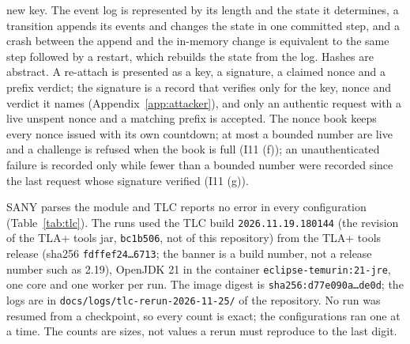 new key. The event log is represented by its
length and the state it determines, a transition appends its events and
changes the state in one committed step, and a crash between the append and the in-memory change is
equivalent to the same step followed by a restart, which rebuilds the
state from the log. Hashes are abstract. A re-attach is presented as a key, a signature, a
claimed nonce and a prefix verdict; the signature is a record that verifies
only for the key, nonce and verdict it names (Appendix~\ref{app:attacker}),
and only an authentic request with a live unspent nonce and a matching prefix
is accepted. The nonce book keeps every nonce issued with its own countdown;
at most a bounded number are live and a challenge is refused when the book is
full (I11 (f)); an unauthenticated failure is recorded only while fewer than a
bounded number were recorded since the last request whose signature verified
(I11 (g)).

SANY parses the module and TLC reports no error in every configuration
(Table~\ref{tab:tlc}). The runs used the TLC build
\texttt{2026.11.19.180144} (the revision of the TLA+ tools jar, \texttt{bc1b506}, not of this repository) from the TLA+ tools release
(sha256 \texttt{fdffef24\ldots 6713}; the banner is a build
number, not a release number such as 2.19), OpenJDK 21 in the container
\texttt{eclipse-temurin:21-jre}, one core and one worker per run. The image digest is
\texttt{sha256:d77e090a\ldots de0d}; the
logs are in \texttt{docs/logs/tlc-rerun-2026-11-25/} of the repository. No run
was resumed from a checkpoint, so every count is exact; the configurations ran one
at a time. The counts are sizes, not values a rerun must reproduce
to the last digit.

